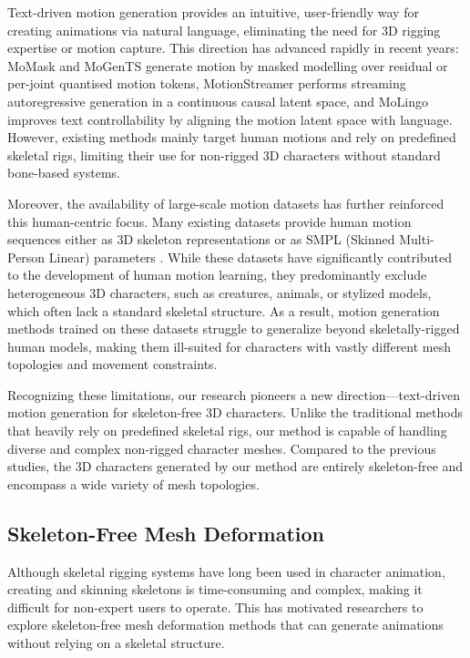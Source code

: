 \documentclass[lettersize,journal]{IEEEtran}
\newcommand{\blu}[1]{\texorpdfstring{{\leavevmode\color{blue}#1}}{#1}}
\begin{document}
Text-driven motion generation provides an intuitive, user-friendly way for creating animations via natural language, eliminating the need for 3D rigging expertise or motion capture. \blu{This direction has advanced rapidly in recent years: MoMask
\cite{guo2024momask} and MoGenTS \cite{yuan2024mogents} generate motion by masked modelling over residual
or per-joint quantised motion tokens, MotionStreamer \cite{xiao2025motionstreamer} performs
streaming autoregressive generation in a continuous causal latent space, and MoLingo
\cite{he2025molingo} improves text controllability by aligning the motion latent space with
language.} However, existing methods mainly target human motions and rely on predefined skeletal rigs, limiting their use for non-rigged 3D characters without standard bone-based systems.

Moreover, the availability of large-scale motion datasets has further reinforced this human-centric focus. Many existing datasets provide human motion sequences either as 3D skeleton representations \cite{liu2019ntu, guo2020action2motion, guo2022generating} or as SMPL (Skinned Multi-Person Linear) parameters \cite{mahmood2019amass}. While these datasets have significantly contributed to the development of human motion learning, they predominantly exclude heterogeneous 3D characters, such as creatures, animals, or stylized models, which often lack a standard skeletal structure. As a result, motion generation methods trained on these datasets \cite{zhang2024motiondiffuse,tevet2022human, chen2022executing} struggle to generalize beyond skeletally-rigged human models, making them ill-suited for characters with vastly different mesh topologies and movement constraints.

Recognizing these limitations, our research pioneers a new direction—text-driven motion generation for skeleton-free 3D characters. Unlike the traditional methods that heavily rely on predefined skeletal rigs, our method is capable of handling diverse and complex non-rigged character meshes. Compared to the previous studies, the 3D characters generated by our method are entirely skeleton-free and encompass a wide variety of mesh topologies.

\subsection{Skeleton-Free Mesh Deformation}

Although skeletal rigging systems have long been used in character animation\cite{magnenat1988joint}, creating and skinning skeletons is time-consuming and complex, making it difficult for non-expert users to operate. This has motivated researchers to explore skeleton-free mesh deformation methods that can generate animations without relying on a skeletal structure.
\end{document}
